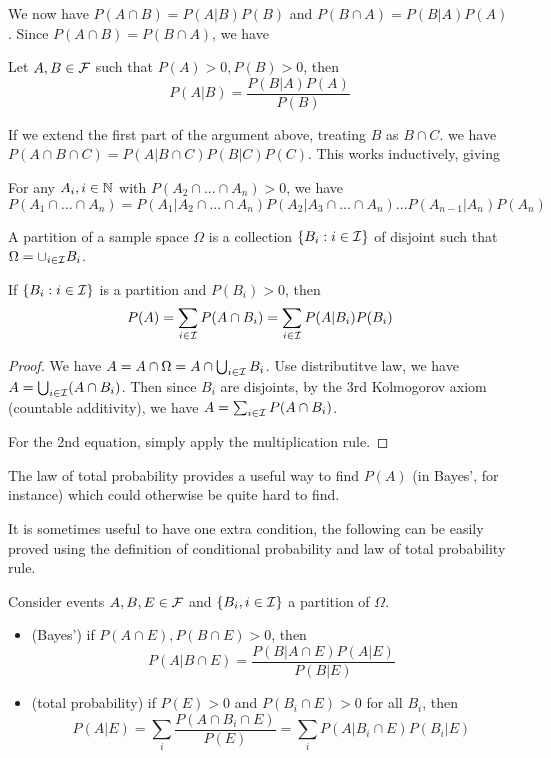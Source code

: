 \documentclass[11pt]{article}
\begin{document}
We now have \(P(A\cap B)=P(A|B)P(B)\) and \(P(B\cap A)=P(B|A)P(A)\). Since \(P(A\cap B)=P(B\cap A)\), we have 
\begin{theorem}
  Let \(A,B\in\cal{F}\) such that \(P(A)>0,P(B)>0\), then
  \[P(A|B)=\frac{P(B|A)P(A)}{P(B)}\]
\end{theorem}

If we extend the first part of the argument above, treating \(B\) as \(B\cap C\). we have \(P(A\cap B\cap C)=P(A|B\cap C)P(B|C)P(C)\). This works inductively, giving

\begin{theorem}
  For any \(A_i,i\in\N\) with \(P(A_2\cap...\cap A_n)>0\), we have
  \[P(A_1\cap ... \cap A_n)=P(A_1|A_2\cap...\cap A_n)P(A_2|A_3\cap...\cap A_n)...P(A_{n-1}|A_n)P(A_n)\]
\end{theorem}

\begin{definition}[Partition]
  A partition of a sample space \(\Omega\) is a collection \(\{B_i:i\in\cal{I}\}\) of disjoint such that \(\Omega=\cup_{i\in\cal{I}}B_i\).
\end{definition}

\begin{theorem}
  If \(\{B_i:i\in\cal{I}\}\) is a partition and \(P(B_i)>0\), then
  \[P(A)=\sum_{i\in\cal{I}}P(A\cap B_i)=\sum_{i\in\cal{I}}P(A|B_i)P(B_i)\]
\end{theorem}
\begin{proof}
  We have \(A=A\cap\Omega=A\cap\bigcup_{i\in\cal{I}}B_i\). Use distributitve law, we have \(A=\bigcup_{i\in\cal{I}}(A\cap B_i)\). Then since \(B_i\) are disjoints, by the 3rd Kolmogorov axiom (countable additivity), we have \(A=\sum_{i\in\cal{I}}P(A\cap B_i)\).

  For the 2nd equation, simply apply the multiplication rule.
\end{proof}

The law of total probability provides a useful way to find \(P(A)\) (in Bayes', for instance) which could otherwise be quite hard to find.

It is sometimes useful to have one extra condition, the following can be easily proved using the definition of conditional probability and law of total probability rule.
\begin{proposition}
  Consider events \(A,B,E\in\cal{F}\) and \(\{B_i,i\in\cal{I}\}\) a partition of \(\Omega\).
  \begin{itemize}
    \item (Bayes') if \(P(A\cap E),P(B\cap E)>0\), then \[P(A|B\cap E)=\frac{P(B|A\cap E)P(A|E)}{P(B|E)}\]
    \item (total probability) if \(P(E)>0\) and \(P(B_i\cap E)>0\) for all \(B_i\), then \[P(A|E)=\sum_i\frac{P(A\cap B_i\cap E)}{P(E)}=\sum_i P(A|B_i\cap E)P(B_i|E)\]
  \end{itemize}
\end{proposition}
\end{document}
